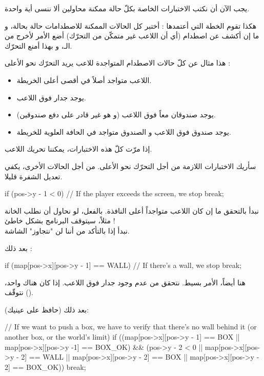 يجب الآن أن نكتب الاختبارات الخاصة بكلّ حالة ممكنة محاولين ألا ننسى أية واحدة. 

هكذا تقوم الخطة التي أعتمدها : أختبر كل الحالات الممكنة للاصطدامات حالة بحالة، و ما إن أكشف عن اصطدام (أي أن اللاعب غير متمكّن من التحرّك) أضع الأمر
لأخرج من الـ،
و بهذا أمنع التحرّك.

هذا مثال عن كلّ حالات الاصطدام المتواجدة للاعب يريد التحرّك نحو الأعلى :

\begin{itemize}
	\item اللاعب متواجد أصلاً في أقصى أعلى الخريطة.
	\item يوجد جدار فوق اللاعب.
	\item يوجد صندوقان معاً فوق اللاعب (و هو غير قادر على دفع صندوقين).
	\item يوجد صندوق فوق اللاعب و الصندوق متواجد في الحافة العلوية للخريطة.
\end{itemize}

إذا مرّت كلّ هذه الاختبارات، يمكننا تحريك اللاعب. 

سأريك الاختبارات اللازمة من أجل التحرّك نحو الأعلى. من أجل الحالات الأخرى، يكفي تعديل الشفرة قليلا.

\begin{Csource}
if (pos->y - 1 < 0) // If the player exceeds the screen, we stop
	break;
\end{Csource}

نبدأ بالتحقق ما إن كان اللاعب متواجداً أعلى النافذة. بالفعل، لو نحاول أن نطلب الخانة 
مثلاً، سيتوقف البرنامج بشكل خاطئ !\\
نبدأ إذا بالتأكد من أننا لن "نتجاوز" الشاشة.

بعد ذلك :

\begin{Csource}
if (map[pos->x][pos->y - 1] == WALL) // If there's a wall, we stop
	break;
\end{Csource}

هنا أيضاً، الأمر بسيط. نتحقق من عدم وجود جدار فوق اللاعب. إذا كان هناك واحد، نتوقّف
().

بعد ذلك (حافظ على عينيك): 

\begin{Csource}
// If we want to push a box, we have to verify that there's no wall behind it (or another box, or the world's limit)
if ((map[pos->x][pos->y - 1] == BOX || map[pos->x][pos->y -1] == BOX_OK) && (pos->y - 2 < 0 || map[pos->x][pos->y - 2] == WALL || map[pos->x][pos->y - 2] == BOX || map[pos->x][pos->y - 2] == BOX_OK))
	break;
\end{Csource}

